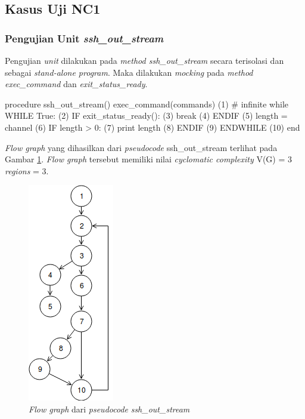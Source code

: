 \subsection{Kasus Uji NC1}

\subsubsection{Pengujian Unit \emph{ssh\_out\_stream}}

Pengujian \emph{unit} dilakukan pada \emph{method ssh\_out\_stream}
secara terisolasi dan sebagai \emph{stand-alone program}. Maka
dilakukan \emph{mocking} pada \emph{method exec\_command} dan
\emph{exit\_status\_ready}.

\begin{code}
\begin{ignasicblock}[title=ssh\_out\_stream,minted language=text]
procedure ssh_out_stream()
    exec_command(commands)                 (1)
    # infinite while
    WHILE True:                            (2)
        IF exit_status_ready():            (3)
            break                          (4)
        ENDIF                              (5)
        length = channel                   (6)
        IF length > 0:                     (7)
            print length                   (8)
        ENDIF                              (9)
    ENDWHILE                               (10)
end
\end{ignasicblock}
\label{pc:ssh_out_stream}
\end{code}

\par\null\par
\noindent
\emph{Flow graph} yang dihasilkan dari \emph{pseudocode}
ssh\_out\_stream terlihat pada Gambar \ref{cfg:ssh_out_stream}.
\emph{Flow graph} tersebut memiliki nilai \emph{cyclomatic complexity} V(G) = 3 \emph{regions} = 3.

\begin{figure}[H]
  \centering
  \includegraphics[width=.2\linewidth]{img/test-case/ssh_out_stream}
  \caption{\emph{Flow graph} dari \emph{pseudocode} \emph{ssh\_out\_stream}}
  \label{cfg:ssh_out_stream}
\end{figure}

